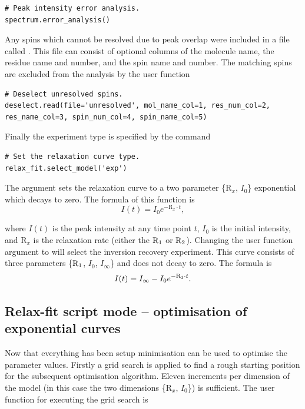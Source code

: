 \begin{lstlisting}[firstnumber=53]
# Peak intensity error analysis.
spectrum.error_analysis()
\end{lstlisting}

Any spins which cannot be resolved due to peak overlap were included in a file called .  This file can consist of optional columns of the molecule name, the residue name and number, and the spin name and number.  The matching spins are excluded from the analysis by the user function

\begin{lstlisting}[firstnumber=56]
# Deselect unresolved spins.
deselect.read(file='unresolved', mol_name_col=1, res_num_col=2, res_name_col=3, spin_num_col=4, spin_name_col=5)
\end{lstlisting}

Finally the experiment type is specified by the command

\begin{lstlisting}[firstnumber=59]
# Set the relaxation curve type.
relax_fit.select_model('exp')
\end{lstlisting}

The argument  sets the relaxation curve to a two parameter \{$\mathrm{R}_x$, $I_0$\} exponential which decays to zero.  The formula of this function is
\begin{equation}
 I(t) = I_0 e^{-\mathrm{R}_x \cdot t},
\end{equation}

\noindent where $I(t)$ is the peak intensity at any time point $t$, $I_0$ is the initial intensity, and $\mathrm{R}_x$ is the relaxation rate (either the $\mathrm{R}_1$ or $\mathrm{R}_2$).  Changing the user function argument to  will select the inversion recovery experiment.  This curve consists of three parameters \{$\mathrm{R}_1$, $I_0$, $I_{\infty}$\} and does not decay to zero.  The formula is
\begin{equation}
 I(t) = I_{\infty} - I_0 e^{-\mathrm{R}_1 \cdot t}.
\end{equation}




\subsection{Relax-fit script mode -- optimisation of exponential curves}

Now that everything has been setup minimisation can be used to optimise the parameter values.  Firstly a grid search is applied to find a rough starting position for the subsequent optimisation algorithm.  Eleven increments per dimension of the model (in this case the two dimensions \{$\mathrm{R}_x$, $I_0$\}) is sufficient.  The user function for executing the grid search is

